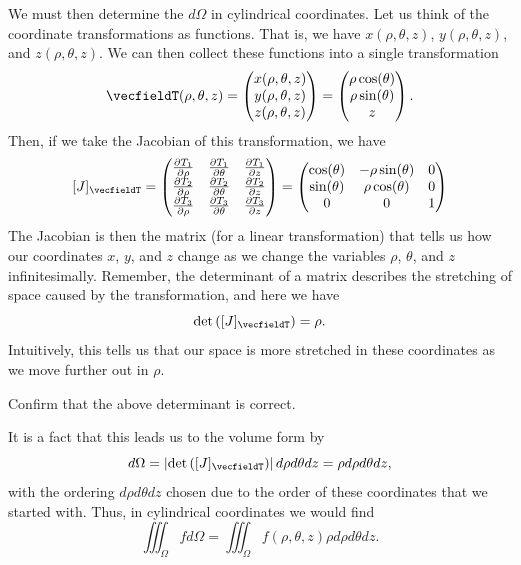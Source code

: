 We must then determine the  $d\Omega$ in cylindrical coordinates.  Let us think of the coordinate transformations as functions.  That is, we have $x(\rho,\theta,z)$, $y(\rho,\theta,z)$, and $z(\rho,\theta,z)$.  We can then collect these functions into a single transformation
\[
\vecfieldT(\rho,\theta,z) = \begin{pmatrix} x(\rho,\theta,z) \\ y(\rho,\theta,z) \\ z(\rho,\theta,z) \end{pmatrix} = \begin{pmatrix} \rho \cos(\theta) \\ \rho \sin(\theta) \\ z \end{pmatrix}.
\]
Then, if we take the Jacobian of this transformation, we have
\[
[J]_{\vecfieldT} = \begin{pmatrix} \frac{\partial T_1}{\partial \rho} & \frac{\partial T_1}{\partial \theta} & \frac{\partial T_1}{\partial z} \\ \frac{\partial T_2}{\partial \rho} & \frac{\partial T_2}{\partial \theta} & \frac{\partial T_2}{\partial z} \\ \frac{\partial T_3}{\partial \rho} & \frac{\partial T_3}{\partial \theta} & \frac{\partial T_3}{\partial z}  \end{pmatrix} =  \begin{pmatrix} \cos(\theta) & - \rho \sin(\theta) & 0 \\ \sin(\theta) & \rho \cos(\theta) & 0 \\ 0 & 0 & 1 \end{pmatrix}
\]
The Jacobian is then the matrix (for a linear transformation) that tells us how our coordinates $x$, $y$, and $z$ change as we change the variables $\rho$, $\theta$, and $z$ infinitesimally.  Remember, the determinant of a matrix describes the stretching of space caused by the transformation, and here we have
\[
\det \left( [J]_{\vecfieldT}\right) = \rho.
\]
Intuitively, this tells us that our space is more stretched in these coordinates as we move further out in $\rho$.

\begin{exercise}
Confirm that the above determinant is correct.
\end{exercise}

It is a fact that this leads us to the volume form by
\[
d\Omega = \left| \det \left([J]_{\vecfieldT}\right)\right|d\rho d\theta dz = \rho d\rho d\theta dz,
\]
with the ordering $d\rho d\theta dz$ chosen due to the order of these coordinates that we started with. Thus, in cylindrical coordinates we would find
\[
\iiint_\Omega f d\Omega = \iiint_\Omega f(\rho,\theta,z) \rho d\rho d\theta dz.
\]

